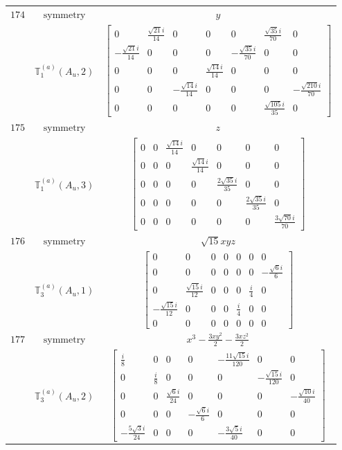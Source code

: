 \documentclass[fleqn,8pt,landscape]{jsarticle}
\begin{document}
\begin{longtable}{ccc}
$ 174 $ & $ \text{symmetry} $ & $ y $ \\
$  $ & $ \mathbb{T}_{1}^{(a)}(A_{u},2) $ & $ \begin{bmatrix} 0 & \frac{\sqrt{21} i}{14} & 0 & 0 & 0 & \frac{\sqrt{35} i}{70} & 0 \\ - \frac{\sqrt{21} i}{14} & 0 & 0 & 0 & - \frac{\sqrt{35} i}{70} & 0 & 0 \\ 0 & 0 & 0 & \frac{\sqrt{14} i}{14} & 0 & 0 & 0 \\ 0 & 0 & - \frac{\sqrt{14} i}{14} & 0 & 0 & 0 & - \frac{\sqrt{210} i}{70} \\ 0 & 0 & 0 & 0 & 0 & \frac{\sqrt{105} i}{35} & 0 \end{bmatrix} $ \\ \hline
$ 175 $ & $ \text{symmetry} $ & $ z $ \\
$  $ & $ \mathbb{T}_{1}^{(a)}(A_{u},3) $ & $ \begin{bmatrix} 0 & 0 & \frac{\sqrt{14} i}{14} & 0 & 0 & 0 & 0 \\ 0 & 0 & 0 & \frac{\sqrt{14} i}{14} & 0 & 0 & 0 \\ 0 & 0 & 0 & 0 & \frac{2 \sqrt{35} i}{35} & 0 & 0 \\ 0 & 0 & 0 & 0 & 0 & \frac{2 \sqrt{35} i}{35} & 0 \\ 0 & 0 & 0 & 0 & 0 & 0 & \frac{3 \sqrt{70} i}{70} \end{bmatrix} $ \\ \hline
$ 176 $ & $ \text{symmetry} $ & $ \sqrt{15} x y z $ \\
$  $ & $ \mathbb{T}_{3}^{(a)}(A_{u},1) $ & $ \begin{bmatrix} 0 & 0 & 0 & 0 & 0 & 0 & 0 \\ 0 & 0 & 0 & 0 & 0 & 0 & - \frac{\sqrt{6} i}{6} \\ 0 & \frac{\sqrt{15} i}{12} & 0 & 0 & 0 & \frac{i}{4} & 0 \\ - \frac{\sqrt{15} i}{12} & 0 & 0 & 0 & \frac{i}{4} & 0 & 0 \\ 0 & 0 & 0 & 0 & 0 & 0 & 0 \end{bmatrix} $ \\ \hline
$ 177 $ & $ \text{symmetry} $ & $ x^{3} - \frac{3 x y^{2}}{2} - \frac{3 x z^{2}}{2} $ \\
$  $ & $ \mathbb{T}_{3}^{(a)}(A_{u},2) $ & $ \begin{bmatrix} \frac{i}{8} & 0 & 0 & 0 & - \frac{11 \sqrt{15} i}{120} & 0 & 0 \\ 0 & \frac{i}{8} & 0 & 0 & 0 & - \frac{\sqrt{15} i}{120} & 0 \\ 0 & 0 & \frac{\sqrt{6} i}{24} & 0 & 0 & 0 & - \frac{\sqrt{10} i}{40} \\ 0 & 0 & 0 & - \frac{\sqrt{6} i}{6} & 0 & 0 & 0 \\ - \frac{5 \sqrt{3} i}{24} & 0 & 0 & 0 & - \frac{3 \sqrt{5} i}{40} & 0 & 0 \end{bmatrix} $ \\ \hline

\end{longtable}
\end{document}

